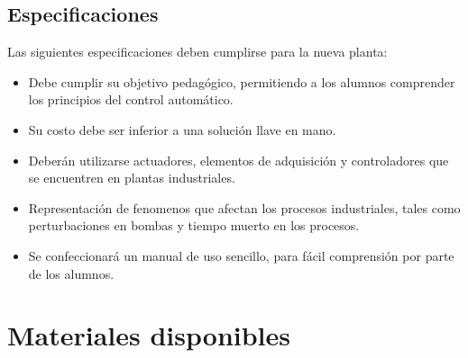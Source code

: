 
\subsection{Especificaciones}

Las siguientes especificaciones deben cumplirse para la nueva
planta:

\begin{itemize}
\item Debe cumplir su objetivo pedagógico, permitiendo 
 a los alumnos comprender los principios del control automático.
 \item Su costo debe ser inferior a una solución llave en mano.
 \item Deberán utilizarse actuadores, elementos de adquisición
 y controladores que se encuentren en plantas industriales.
 \item Representación de fenomenos que afectan los procesos 
 industriales, tales como perturbaciones en bombas y tiempo 
 muerto en los procesos. 
 \item Se confeccionará un manual de uso sencillo, para 
 fácil comprensión por parte de los alumnos.

\end{itemize}

\section{Materiales disponibles}
\label{sec:MaterialesDisponibles}

